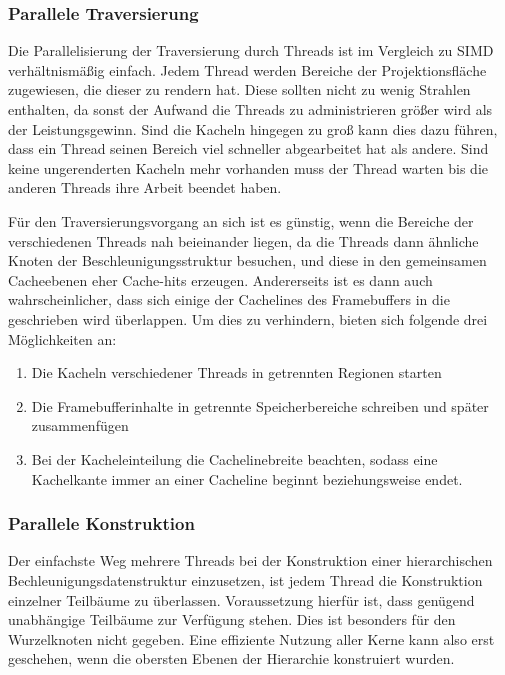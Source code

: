 \subsubsection{Parallele Traversierung}

Die Parallelisierung der Traversierung durch Threads ist im Vergleich zu SIMD verhältnismäßig einfach. Jedem Thread werden Bereiche der Projektionsfläche zugewiesen, die dieser zu rendern hat. Diese sollten nicht zu wenig Strahlen enthalten, da sonst der Aufwand die Threads zu administrieren größer wird als der Leistungsgewinn. Sind die Kacheln hingegen zu groß kann dies dazu führen, dass ein Thread seinen Bereich viel schneller abgearbeitet hat als andere. Sind keine ungerenderten Kacheln mehr vorhanden muss der Thread warten bis die anderen Threads ihre Arbeit beendet haben.

Für den Traversierungsvorgang an sich ist es günstig, wenn die Bereiche der verschiedenen Threads nah beieinander liegen, da die Threads dann ähnliche Knoten der Beschleunigungsstruktur besuchen, und diese in den gemeinsamen Cacheebenen eher Cache-hits erzeugen. Andererseits ist es dann auch wahrscheinlicher, dass sich einige der Cachelines des Framebuffers in die geschrieben wird überlappen. Um dies zu verhindern, bieten sich folgende drei Möglichkeiten an:
\begin{enumerate}
 \item Die Kacheln verschiedener Threads in getrennten Regionen starten
 \item Die Framebufferinhalte in getrennte Speicherbereiche schreiben und später zusammenfügen
 \item Bei der Kacheleinteilung die Cachelinebreite beachten, sodass eine Kachelkante immer an einer Cacheline beginnt beziehungsweise endet.
\end{enumerate}

\subsubsection{Parallele Konstruktion}

Der einfachste Weg mehrere Threads bei der Konstruktion einer hierarchischen Bechleunigungsdatenstruktur einzusetzen, ist jedem Thread die Konstruktion einzelner Teilbäume zu überlassen. Voraussetzung hierfür ist, dass genügend unabhängige Teilbäume zur Verfügung stehen. Dies ist besonders für den Wurzelknoten nicht gegeben. Eine effiziente Nutzung aller Kerne kann also erst geschehen, wenn die obersten Ebenen der Hierarchie konstruiert wurden.

